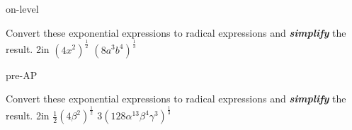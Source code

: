 \begin{taggedblock}{on-level}
    \begin{myProblems2}{%
        Convert these exponential expressions to radical expressions
        and \textbf{\itshape simplify} the result.
        }%
        {2in}
        {
            $ \left( 4x^2 \right)^{\frac{1}{2}}$ 
        }
        {
            $ \left( 8a^3b^4 \right)^\frac{1}{3}$ 
        }
    \end{myProblems2}
\end{taggedblock}
\begin{taggedblock}{pre-AP}
    \begin{myProblems2}{%
        Convert these exponential expressions to radical expressions
        and \textbf{\itshape simplify} the result.
        }%
        {2in}
        {
            \Large $ \frac{1}{2} \left( 4\beta^2 \right)^{\frac{1}{2}}$ 
        }
        {
            \Large $ 3 \left( 128\alpha^{13}\beta^4\gamma^3 \right)^\frac{1}{3}$ 
        }
    \end{myProblems2}
\end{taggedblock}


